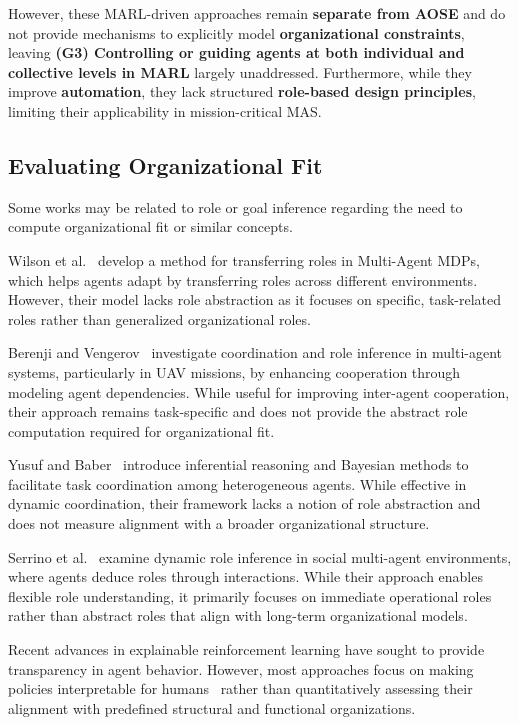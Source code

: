 \documentclass[journal]{IEEEtai}
\begin{document}
However, these MARL-driven approaches remain \textbf{separate from AOSE} and do not provide mechanisms to explicitly model \textbf{organizational constraints}, leaving \textbf{(G3) Controlling or guiding agents at both individual and collective levels in MARL} largely unaddressed. Furthermore, while they improve \textbf{automation}, they lack structured \textbf{role-based design principles}, limiting their applicability in mission-critical MAS.

\subsection{Evaluating Organizational Fit}

Some works may be related to role or goal inference regarding the need to compute organizational fit or similar concepts.

Wilson et al.~\cite{wilson2008learning} develop a method for transferring roles in Multi-Agent MDPs, which helps agents adapt by transferring roles across different environments. However, their model lacks role abstraction as it focuses on specific, task-related roles rather than generalized organizational roles.

Berenji and Vengerov~\cite{berenji2000learning} investigate coordination and role inference in multi-agent systems, particularly in UAV missions, by enhancing cooperation through modeling agent dependencies. While useful for improving inter-agent cooperation, their approach remains task-specific and does not provide the abstract role computation required for organizational fit.

Yusuf and Baber~\cite{yusuf2020inferential} introduce inferential reasoning and Bayesian methods to facilitate task coordination among heterogeneous agents. While effective in dynamic coordination, their framework lacks a notion of role abstraction and does not measure alignment with a broader organizational structure.

Serrino et al.~\cite{serrino2019finding} examine dynamic role inference in social multi-agent environments, where agents deduce roles through interactions. While their approach enables flexible role understanding, it primarily focuses on immediate operational roles rather than abstract roles that align with long-term organizational models.

Recent advances in explainable reinforcement learning have sought to provide transparency in agent behavior. However, most approaches focus on making policies interpretable for humans~\cite{van2018explainable} rather than quantitatively assessing their alignment with predefined structural and functional organizations.
\end{document}
